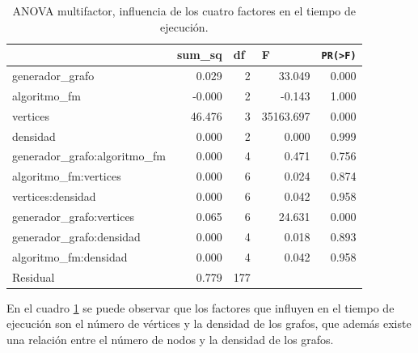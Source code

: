 \documentclass{article}
\begin{document}
\begin{table}[htbp]
  \centering
  \caption{ANOVA multifactor, influencia de los cuatro factores en el tiempo de ejecución.}
    \begin{tabular}{lrrrr}
    \toprule
          & \multicolumn{1}{l}{\textbf{sum\_sq}} & \multicolumn{1}{l}{\textbf{df}} & \multicolumn{1}{l}{\textbf{F}} & \multicolumn{1}{l}{\textbf{\texttt{PR(>F)}}} \\
    \midrule
    generador\_grafo & 0.029 & 2     & 33.049 & 0.000 \\
    algoritmo\_fm & -0.000 & 2     & -0.143 & 1.000 \\
    vertices & 46.476 & 3     & 35163.697 & 0.000 \\
    densidad & 0.000 & 2     & 0.000 & 0.999 \\
    generador\_grafo:algoritmo\_fm & 0.000 & 4     & 0.471 & 0.756 \\
    algoritmo\_fm:vertices & 0.000 & 6     & 0.024 & 0.874 \\
    vertices:densidad & 0.000 & 6     & 0.042 & 0.958 \\
    generador\_grafo:vertices & 0.065 & 6     & 24.631 & 0.000 \\
    generador\_grafo:densidad & 0.000 & 4     & 0.018 & 0.893 \\
    algoritmo\_fm:densidad & 0.000 & 4     & 0.042 & 0.958 \\
    Residual & 0.779 & 177  &       &  \\
    \bottomrule
    \end{tabular}%
  \label{tab:t7}%
\end{table}%
En el cuadro \ref{tab:t7} se puede observar que los factores que influyen en el tiempo de ejecución son el número de vértices y la densidad de los grafos, que además existe una relación entre el número de nodos y la densidad de los grafos. 

\newpage


\end{document}
